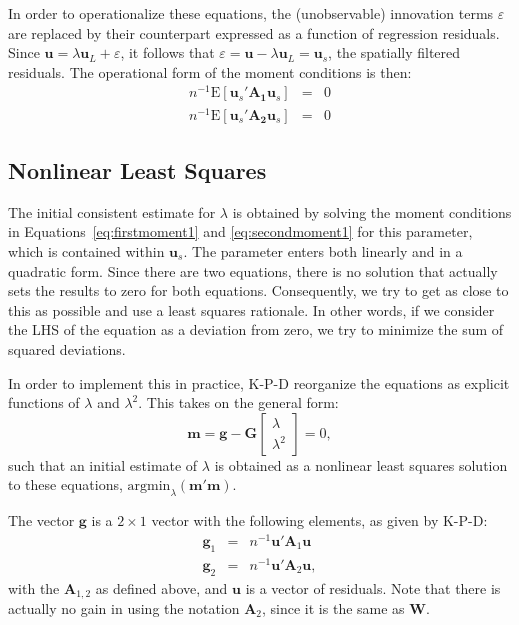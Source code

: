 \documentclass{article}
\begin{document}
In order to operationalize these equations, the (unobservable) innovation terms
$\varepsilon$ are replaced by their counterpart expressed as a function of regression
residuals. Since $\mathbf{u} = \lambda \mathbf{u}_L + \varepsilon$, it follows that
$\varepsilon = \mathbf{u} - \lambda \mathbf{u}_L = \mathbf{u}_s$, the spatially
filtered residuals. The operational form of the moment conditions is
then:
\begin{eqnarray}
n^{-1} \mbox{E} [ \mathbf{u}_s ' \mathbf{A_1} \mathbf{u}_s ] &=& 0 \label{eq:firstmoment1}\\
n^{-1} \mbox{E} [ \mathbf{u}_s ' \mathbf{A_2} \mathbf{u}_s ] &=& 0 \label{eq:secondmoment1}
\end{eqnarray}

\subsection{Nonlinear Least Squares}\label{ss:nonlinearls}
The initial consistent estimate for $\lambda$ is obtained by solving the moment
conditions in Equations~\ref{eq:firstmoment1} and \ref{eq:secondmoment1} for this parameter, which is contained within $\mathbf{u}_s$. The parameter
enters both linearly and in a quadratic form. Since there are two equations,
there is no solution that actually sets the results to zero for both equations.
Consequently, we try to get as close to this as possible and use a least squares
rationale. In other words, if we consider the LHS of the equation as a deviation
from zero, we try to minimize the sum of squared deviations.

In order to implement this in practice, K-P-D reorganize the equations as 
explicit functions of $\lambda$ and $\lambda^2$. This takes on the general form:
\begin{equation}\label{eq:mgg}
\mathbf{m} = \mathbf{g} - \mathbf{G}
\left[
\begin{matrix}
\lambda\\
\lambda^2
\end{matrix}
\right] = 0,
\end{equation}
such that an initial estimate of $\lambda$ is obtained as a nonlinear least
squares solution to these equations, $\mbox{argmin}_\lambda (\mathbf{m'm})$.

The vector $\mathbf{g}$ is a $2 \times 1$ vector with the following elements,
as given by K-P-D:
\begin{eqnarray}
 \mathbf{g}_1 &=& n^{-1} \mathbf{u}' \mathbf{A}_1 \mathbf{u} \label{eq:g1} \\
  \mathbf{g}_2 &=& n^{-1} \mathbf{u}' \mathbf{A}_2 \mathbf{u}, \label{eq:g2}
\end{eqnarray}
with the $\mathbf{A}_{1,2}$ as defined above, and $\mathbf{u}$ is a vector
of residuals. Note that there is actually no gain in using the notation $\mathbf{A}_2$,
since it is the same as $\mathbf{W}$.
\end{document}
